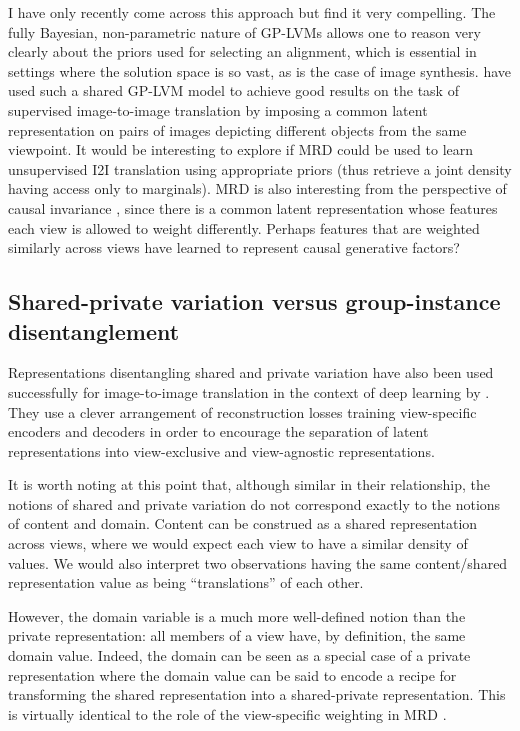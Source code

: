 \documentclass[../thesis.tex]{subfiles}
\begin{document}
I have only recently come across this approach but find it very compelling. The fully Bayesian, non-parametric nature of GP-LVMs allows one to reason very clearly about the priors used for selecting an alignment, which is essential in settings where the solution space is so vast, as is the case of image synthesis. \citet{shon2006learning} have used such a shared GP-LVM model to achieve good results on the task of supervised image-to-image translation by imposing a common latent representation on pairs of images depicting different objects from the same viewpoint. It would be interesting to explore if MRD could be used to learn unsupervised I2I translation using appropriate priors (thus retrieve a joint density having access only to marginals). MRD is also interesting from the perspective of causal invariance \citep{petersCausalInferenceUsing2016, arjovskyInvariantRiskMinimization2019}, since there is a common latent representation whose features each view is allowed to weight differently. Perhaps features that are weighted similarly across views have learned to represent causal generative factors?

\subsection{Shared-private variation versus group-instance disentanglement}

Representations disentangling shared and private variation have also been used successfully for image-to-image translation in the context of deep learning by \citet{gonzalez2018image}. They use a clever arrangement of reconstruction losses training view-specific encoders and decoders in order to encourage the separation of latent representations into view-exclusive and view-agnostic representations.

It is worth noting at this point that, although similar in their relationship, the notions of shared and private variation do not correspond exactly to the notions of content and domain. Content can be construed as a shared representation across views, where we would expect each view to have a similar density of values. We would also interpret two observations having the same content/shared representation value as being ``translations'' of each other.

However, the domain variable is a much more well-defined notion than the private representation: all members of a view have, by definition, the same domain value. Indeed, the domain can be seen as a special case of a private representation where the domain value can be said to encode a recipe for transforming the shared representation into a shared-private representation. This is virtually identical to the role of the view-specific weighting in MRD \citep{damianou2016multi}. 


\biblio
\end{document}
